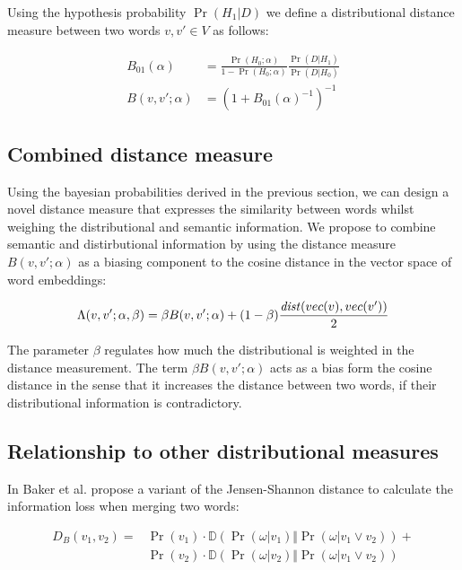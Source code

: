 Using the hypothesis probability $\Pr(H_1|D)$ we define a
distributional distance measure between two words $v, v' \in V$ as follows:

\begin{equation*}
\begin{split}
	B_{01}(\alpha) &= \frac{\Pr(H_0; \alpha)}{1-\Pr(H_0;
	\alpha)}\frac{\Pr(D|H_1)}{\Pr(D|H_0)} \\
	B(v,v'; \alpha) &= \left(1+{B_{01}(\alpha)}^{-1}\right)^{-1}	
\end{split}
\end{equation*}


\subsection{Combined distance measure}

Using the bayesian probabilities derived in the previous section, we can design
a novel distance measure that expresses the similarity between words whilst
weighing the distributional and semantic information. We propose to
combine semantic and distirbutional information by using the distance measure
$B(v,v';\alpha)$ as a biasing component to the cosine distance in the vector
space of word embeddings:

\begin{equation*}
	\Lambda(v, v'; \alpha, \beta) = \beta B(v,v'; \alpha) +
	(1-\beta)\frac{\mathit{dist}(vec(v),vec(v'))}{2}
\end{equation*}

The parameter $\beta$ regulates how much the distributional is weighted in the
distance measurement. The term $\beta B(v,v'; \alpha)$ acts as a bias form the
cosine distance in the sense that it increases the distance between two words,
if their distributional information is contradictory. 
\subsection{Relationship to other distributional measures}

In \cite{baker1998distributional} Baker et al. propose a variant of the
Jensen-Shannon distance to calculate the information loss when merging two
words:

\begin{equation*}
\begin{split}
D_B(v_1, v_2) = &\Pr(v_1) \cdot
\mathbb{D}\left(\Pr(\omega|v_1)\Vert\Pr(\omega|v_1 \lor v_2)\right) + \\  
&\Pr(v_2) \cdot \mathbb{D}\left(\Pr(\omega|v_2)\Vert\Pr(\omega|v_1 \lor v_2)\right)
\end{split}
\end{equation*} 

